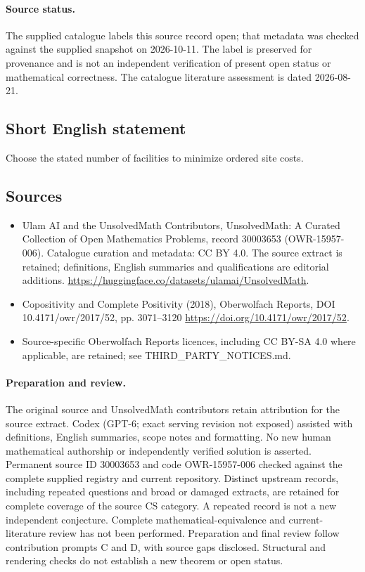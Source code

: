 \documentclass[11pt]{article}
\begin{document}
\paragraph{Source status.}
The supplied catalogue labels this source record open; that metadata was checked against the supplied snapshot on 2026-10-11. The label is preserved for provenance and is not an independent verification of present open status or mathematical correctness. The catalogue literature assessment is dated 2026-08-21.
\subsection{Short English statement}
Choose the stated number of facilities to minimize ordered site costs.
\subsection{Sources}
\begin{itemize}
\item[S1] Ulam AI and the UnsolvedMath Contributors, UnsolvedMath: A Curated Collection of Open Mathematics Problems, record 30003653 (OWR-15957-006). Catalogue curation and metadata: CC BY 4.0. The source extract is retained; definitions, English summaries and qualifications are editorial additions.
\url{https://huggingface.co/datasets/ulamai/UnsolvedMath}.
\item[S2] Copositivity and Complete Positivity (2018), Oberwolfach Reports, DOI 10.4171/owr/2017/52, pp. 3071--3120
\url{https://doi.org/10.4171/owr/2017/52}.
\item Source-specific Oberwolfach Reports licences, including CC BY-SA 4.0 where applicable, are retained; see THIRD\_PARTY\_NOTICES.md.
\end{itemize}
\paragraph{Preparation and review.}
The original source and UnsolvedMath contributors retain attribution for the source extract. Codex (GPT-6; exact serving revision not exposed) assisted with definitions, English summaries, scope notes and formatting. No new human mathematical authorship or independently verified solution is asserted. Permanent source ID 30003653 and code OWR-15957-006 checked against the complete supplied registry and current repository. Distinct upstream records, including repeated questions and broad or damaged extracts, are retained for complete coverage of the source CS category. A repeated record is not a new independent conjecture. Complete mathematical-equivalence and current-literature review has not been performed. Preparation and final review follow contribution prompts C and D, with source gaps disclosed. Structural and rendering checks do not establish a new theorem or open status.
\label{end:30003653}
\end{document}
